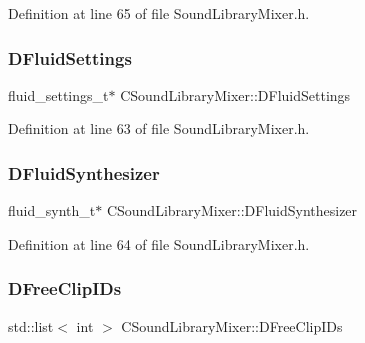 Definition at line 65 of file Sound\+Library\+Mixer.\+h.

\hypertarget{classCSoundLibraryMixer_a2c6fb394c8bed99adb019576dc7f6eee}{}\label{classCSoundLibraryMixer_a2c6fb394c8bed99adb019576dc7f6eee} 
\subsubsection{\texorpdfstring{D\+Fluid\+Settings}{DFluidSettings}}
{\footnotesize\ttfamily fluid\+\_\+settings\+\_\+t$\ast$ C\+Sound\+Library\+Mixer\+::\+D\+Fluid\+Settings\hspace{0.3cm}{\ttfamily [protected]}}



Definition at line 63 of file Sound\+Library\+Mixer.\+h.

\hypertarget{classCSoundLibraryMixer_a6c1663c381dbf2aa18c82a23141f409c}{}\label{classCSoundLibraryMixer_a6c1663c381dbf2aa18c82a23141f409c} 
\subsubsection{\texorpdfstring{D\+Fluid\+Synthesizer}{DFluidSynthesizer}}
{\footnotesize\ttfamily fluid\+\_\+synth\+\_\+t$\ast$ C\+Sound\+Library\+Mixer\+::\+D\+Fluid\+Synthesizer\hspace{0.3cm}{\ttfamily [protected]}}



Definition at line 64 of file Sound\+Library\+Mixer.\+h.

\hypertarget{classCSoundLibraryMixer_a32956ae09580a1ae4c9c037f0f7b5c0b}{}\label{classCSoundLibraryMixer_a32956ae09580a1ae4c9c037f0f7b5c0b} 
\subsubsection{\texorpdfstring{D\+Free\+Clip\+I\+Ds}{DFreeClipIDs}}
{\footnotesize\ttfamily std\+::list$<$ int $>$ C\+Sound\+Library\+Mixer\+::\+D\+Free\+Clip\+I\+Ds\hspace{0.3cm}{\ttfamily [protected]}}




